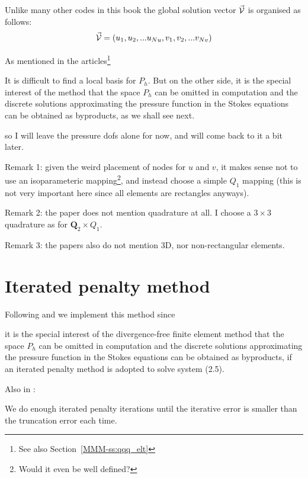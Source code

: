 Unlike many other codes in this book the global solution vector $\vec{\cal V}$ 
is organised as follows:
\[
\vec{\cal V} = ( u_1, u_2, ... u_{Nu}, v_1, v_2, ... v_{Nv})
\]

As mentioned in the articles\footnote{See also Section~\ref{MMM-ss:qqq_elt}}  
\begin{displayquote}
{\color{darkgray}
It is difficult to ﬁnd a
local basis for $P_h$. But on the other side, it is the special interest of the method that
the space $P_h$ can be omitted in computation and the discrete solutions approximating
the pressure function in the Stokes equations can be obtained as byproducts, as we
shall see next.}
\end{displayquote}
so I will leave the pressure dofs alone for now, and will come back to it a bit later.

Remark 1: given the weird placement of nodes for $u$ and $v$, it makes sense not to 
use an isoparameteric 
mapping\footnote{Would it even be well defined?}, and instead choose a simple $Q_1$ mapping (this 
is not very important here since all elements are rectangles anyways).

Remark 2: the paper does not mention quadrature at all. 
I choose a $3\times 3$ quadrature as for ${\bm Q}_2\times Q_1$. 

Remark 3: the papers also do not mention 3D, nor non-rectangular elements. 

\section*{Iterated penalty method}

Following \textcite{zhan09} and \textcite{huzh11} we implement this method since

\begin{displayquote}
{\color{darkgray}
it is the special interest
of the divergence-free ﬁnite element method that the space $P_h$ can be omitted
in computation and the discrete solutions approximating the pressure function
in the Stokes equations can be obtained as byproducts, if an iterated penalty
method is adopted to solve system (2.5).}
\end{displayquote}

Also in \textcite{huzh11}:
\begin{displayquote}
{\color{darkgray}
We do enough iterated penalty iterations until the iterative error is smaller
than the truncation error each time.}
\end{displayquote}

